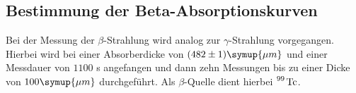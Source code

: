 \subsection{Bestimmung der Beta-Absorptionskurven}    
Bei der Messung der $\beta$-Strahlung wird analog zur $\gamma$-Strahlung vorgegangen. Hierbei wird bei einer Absorberdicke von $(482 \pm 1) \symup{\mu m}$ 
und einer Messdauer von $1100$ s angefangen und dann zehn Messungen bis zu einer Dicke von $100 \symup{\mu m}$ durchgeführt.
Als $\beta$-Quelle dient hierbei $\ce{^{99} Tc}$.